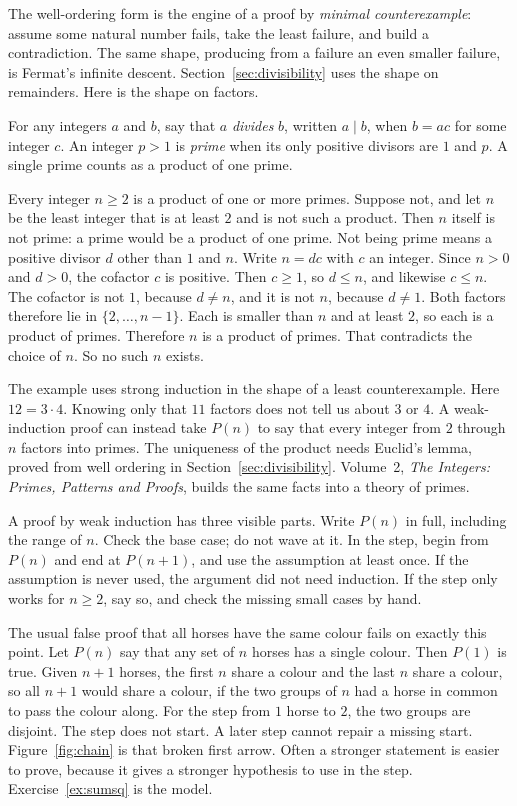 The well-ordering form is the engine of a proof by \emph{minimal counterexample}: assume some natural number fails, take the least failure, and build a contradiction. The same shape, producing from a failure an even smaller failure, is Fermat's infinite descent. Section~\ref{sec:divisibility} uses the shape on remainders. Here is the shape on factors.

For any integers $a$ and $b$, say that $a$ \emph{divides} $b$, written $a\mid b$, when $b=ac$ for some integer $c$. An integer $p>1$ is \emph{prime} when its only positive divisors are $1$ and $p$. A single prime counts as a product of one prime.

\begin{example}
Every integer $n\ge2$ is a product of one or more primes. Suppose not, and let $n$ be the least integer that is at least $2$ and is not such a product. Then $n$ itself is not prime: a prime would be a product of one prime. Not being prime means a positive divisor $d$ other than $1$ and $n$. Write $n=dc$ with $c$ an integer. Since $n>0$ and $d>0$, the cofactor $c$ is positive. Then $c\ge1$, so $d\le n$, and likewise $c\le n$. The cofactor is not $1$, because $d\ne n$, and it is not $n$, because $d\ne1$. Both factors therefore lie in $\{2,\ldots,n-1\}$. Each is smaller than $n$ and at least $2$, so each is a product of primes. Therefore $n$ is a product of primes. That contradicts the choice of $n$. So no such $n$ exists.
\end{example}

The example uses strong induction in the shape of a least counterexample. Here $12=3\cdot4$. Knowing only that $11$ factors does not tell us about $3$ or $4$. A weak-induction proof can instead take $P(n)$ to say that every integer from $2$ through $n$ factors into primes. The uniqueness of the product needs Euclid's lemma, proved from well ordering in Section~\ref{sec:divisibility}. Volume~2, \emph{The Integers: Primes, Patterns and Proofs}, builds the same facts into a theory of primes.

\begin{remark}
A proof by weak induction has three visible parts. Write $P(n)$ in full, including the range of $n$. Check the base case; do not wave at it. In the step, begin from $P(n)$ and end at $P(n+1)$, and use the assumption at least once. If the assumption is never used, the argument did not need induction. If the step only works for $n\ge2$, say so, and check the missing small cases by hand.

The usual false proof that all horses have the same colour fails on exactly this point. Let $P(n)$ say that any set of $n$ horses has a single colour. Then $P(1)$ is true. Given $n+1$ horses, the first $n$ share a colour and the last $n$ share a colour, so all $n+1$ would share a colour, if the two groups of $n$ had a horse in common to pass the colour along. For the step from $1$ horse to $2$, the two groups are disjoint. The step does not start. A later step cannot repair a missing start. Figure~\ref{fig:chain} is that broken first arrow. Often a stronger statement is easier to prove, because it gives a stronger hypothesis to use in the step. Exercise~\ref{ex:sumsq} is the model.
\end{remark}

